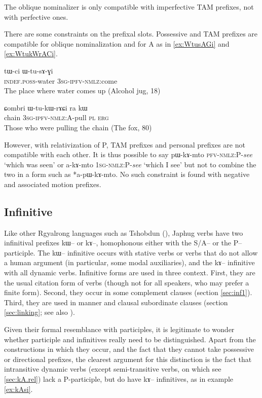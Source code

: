 \documentclass[oldfontcommands,oneside,a4paper,11pt]{article}
\newcommand{\ipa}[1]{{\phon #1}} %
\begin{document}
The oblique nominalizer is only compatible with imperfective TAM prefixes, not with perfective ones. 
 
There are some constraints on  the prefixal slots. Possessive and TAM prefixes are compatible for oblique nominalization and for A as in \ref{ex:WtusAGi} and \ref{ex:WtukWrACi}.

 \begin{exe}
\ex \label{ex:WtusAGi}
\gll
\ipa{tɯ-ci}  	\ipa{ɯ-tu-sɤ-ɣi}  \\
\textsc{indef.poss}-water \textsc{3sg-ipfv-nmlz}:come \\
\glt  The place where water comes up (Alcohol jug, 18)
 \end{exe}
 \begin{exe}
\ex \label{ex:WtukWrACi}
\gll 
\ipa{ɕombri}  	\ipa{ɯ-tu-kɯ-rɤɕi}  	\ipa{ra}  	\ipa{kɯ}  \\
chain \textsc{3sg-ipfv-nmlz:A}-pull \textsc{pl} \textsc{erg} \\
\glt Those who were pulling the chain (The fox, 80)
 \end{exe}

However, with relativization of P, TAM prefixes and personal prefixes are not compatible with each other. It is thus possible to say \ipa{pɯ-kɤ-mto} \textsc{pfv-nmlz:P}-\textit{see} `which was seen' or \ipa{a-kɤ-mto} \textsc{1sg-nmlz:P}-\textit{see} `which I see' but not to combine the two in a form such as *\ipa{a-pɯ-kɤ-mto}. No such constraint is found with negative and associated motion prefixes. 

\subsection{Infinitive}
Like other Rgyalrong languages such as Tshobdun (\citealt[476]{sun12complementation}), Japhug verbs have two infinitival prefixes \ipa{kɯ--} or \ipa{kɤ--}, homophonous either with the S/A-- or the P--participle. The \ipa{kɯ--} infinitive occurs with stative verbs or verbs that do not allow a human argument (in particular, some modal auxiliaries), and the \ipa{kɤ--} infinitive with all dynamic verbs. Infinitive forms are used in three context. First, they are the usual citation form of verbs (though not for all speakers, who may prefer a finite form). Second, they occur in some complement clauses (section \ref{sec:inf1}). Third, they are used in manner and clausal subordinate clauses (section \ref{sec:linking}; see also \citealt{jacques14linking}).


Given their formal resemblance with participles, it is legitimate to wonder whether participle and infinitives really need to be distinguished. Apart from the constructions in which they occur, and the fact that they cannot take possessive or directional prefixes, the clearest argument for this distinction is the fact that intransitive dynamic verbs (except semi-transitive verbs, on which see \ref{sec:kA.rel}) lack a P-participle, but do have \ipa{kɤ--} infinitives, as in example \ref{ex:kAsi}. 
\end{document}
